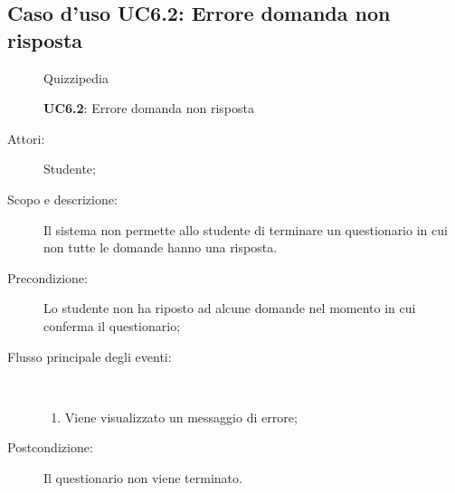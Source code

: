 \subsection{Caso d'uso UC6.2: Errore domanda non risposta}
	\begin{figure}[H]
		\centering
		\begin{resizedtikzpicture}{\textwidth}
		\begin{umlsystem}[x=0, fill=lightgray!20]{Quizzipedia}
		\end{umlsystem}
		\end{resizedtikzpicture}
		\caption{\textbf{UC6.2}: Errore domanda non risposta}
		\label{UC6.2}
	\end{figure}
\begin{description}
\item[Attori:] Studente;
\item[Scopo e descrizione:] Il sistema non permette allo studente di terminare un questionario in cui non tutte le domande hanno una risposta.
      \item[Precondizione:] Lo studente non ha riposto ad alcune domande nel momento in cui conferma il questionario;

        \item[Flusso principale degli eventi:] \ 
 \begin{enumerate}
          \item Viene visualizzato un messaggio di errore;

      \end{enumerate}
    \item[Postcondizione:] Il questionario non viene terminato.
  \end{description}
\hypertarget{UC6.3}{}
